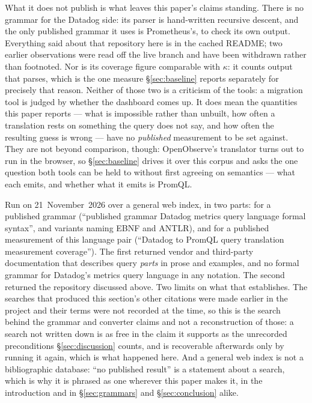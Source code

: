 What it does not publish is what leaves this paper's claims standing. There is no grammar
for the Datadog side: its parser is hand-written recursive descent, and the only
published grammar it uses is Prometheus's, to check its own output. Everything said
about that repository here is in the cached README; two earlier observations were read
off the live branch and have been withdrawn rather than footnoted. Nor is its coverage
figure comparable with $\kappa$: it counts
output that parses, which is the one measure \S\ref{sec:baseline} reports separately for
precisely that reason. Neither of those two is a criticism of the tools: a migration
tool is judged by whether the dashboard comes up.
It does mean the quantities this paper reports --- what is impossible rather than
unbuilt, how often a translation rests on something the query does not say, and how
often the resulting guess is wrong --- have no \emph{published} measurement to be set
against. They are not beyond comparison, though: OpenObserve's translator turns out to
run in the browser, so \S\ref{sec:baseline} drives it over this corpus and asks the one
question both tools can be held to without first agreeing on semantics --- what each
emits, and whether what it emits is PromQL.

\begin{remark}
\label{rem:search}
Run on 21~November~2026 over a general web index, in two parts: for a published grammar
(``published grammar Datadog metrics query language formal syntax'', and variants naming
EBNF and ANTLR), and for a published measurement of this language pair (``Datadog to
PromQL query translation measurement coverage''). The first returned vendor and
third-party documentation that describes query \emph{parts} in prose and examples, and no
formal grammar for Datadog's metrics query language in any notation. The second returned
the repository discussed above. Two limits on what that establishes. The searches that
produced this section's other citations were made earlier in the project and their terms
were not recorded at the time, so this is the search behind the grammar and converter
claims and not a reconstruction of those: a search not written down is as
free in the claim it supports as the unrecorded preconditions \S\ref{sec:discussion}
counts, and is recoverable afterwards only by running it again, which is what happened
here. And a general web index is not a bibliographic database: ``no
published result'' is a statement about a search, which is why it is phrased as one
wherever this paper makes it, in the introduction and in \S\ref{sec:grammars} and
\S\ref{sec:conclusion} alike.
\end{remark}

